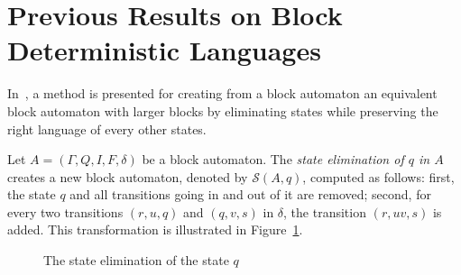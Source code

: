 \documentclass{llncs}
\begin{document}
\section{Previous Results on Block Deterministic Languages}\label{se:PrevRes}

	In~\cite{GMW01}, a method is presented for creating from a block automaton an equivalent block automaton with larger blocks by eliminating states while preserving the right language of every other states.
	
	Let $A = (\Gamma, Q, I, F, \delta)$ be a block automaton.
	The \emph{state elimination of $q$ in $A$} creates a new block automaton, denoted by $\mathcal{S}(A,q)$, computed as follows: first, the state $q$ and all transitions going in and out of it are removed; second, for every two transitions $(r, u, q)$ and $(q, v, s)$ in $\delta$, the transition $(r, uv, s)$ is added.
	This transformation is illustrated in Figure~\ref{fg:StateElim}.

\begin{figure}[H]
	\begin{minipage}[b]{.48\linewidth}
		\centering
		
	
	\end{minipage}
	\hfill
	\begin{minipage}[b]{.48\linewidth}
		\centering
			

	\end{minipage}
	\caption{The state elimination of the state $q$}
	\label{fg:StateElim}
\end{figure}
\end{document}
